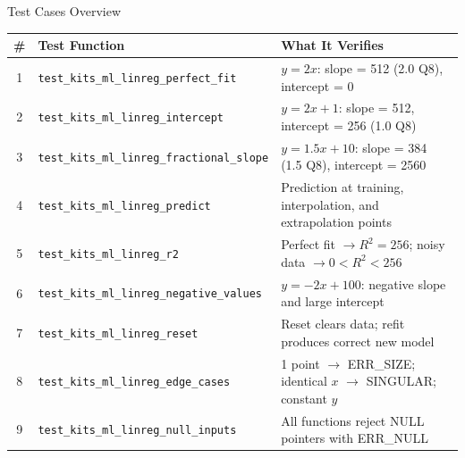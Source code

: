 \documentclass[aspectratio=169, 10pt]{beamer}
\begin{document}
\begin{frame}{Test Cases Overview}
\begin{table}
\centering
\small
\begin{tabular}{@{}clp{7cm}@{}}
\toprule
\textbf{\#} & \textbf{Test Function} & \textbf{What It Verifies} \\
\midrule
1 & \texttt{test\_kits\_ml\_linreg\_perfect\_fit}
  & $y = 2x$: slope = 512 (2.0 Q8), intercept = 0 \\
2 & \texttt{test\_kits\_ml\_linreg\_intercept}
  & $y = 2x + 1$: slope = 512, intercept = 256 (1.0 Q8) \\
3 & \texttt{test\_kits\_ml\_linreg\_fractional\_slope}
  & $y = 1.5x + 10$: slope = 384 (1.5 Q8), intercept = 2560 \\
4 & \texttt{test\_kits\_ml\_linreg\_predict}
  & Prediction at training, interpolation, and extrapolation points \\
5 & \texttt{test\_kits\_ml\_linreg\_r2}
  & Perfect fit $\rightarrow R^2 = 256$; noisy data $\rightarrow 0 < R^2 < 256$ \\
6 & \texttt{test\_kits\_ml\_linreg\_negative\_values}
  & $y = -2x + 100$: negative slope and large intercept \\
7 & \texttt{test\_kits\_ml\_linreg\_reset}
  & Reset clears data; refit produces correct new model \\
8 & \texttt{test\_kits\_ml\_linreg\_edge\_cases}
  & 1 point $\rightarrow$ ERR\_SIZE; identical $x$ $\rightarrow$ SINGULAR; constant $y$ \\
9 & \texttt{test\_kits\_ml\_linreg\_null\_inputs}
  & All functions reject NULL pointers with ERR\_NULL \\
\bottomrule
\end{tabular}
\end{table}
\end{frame}
\end{document}
